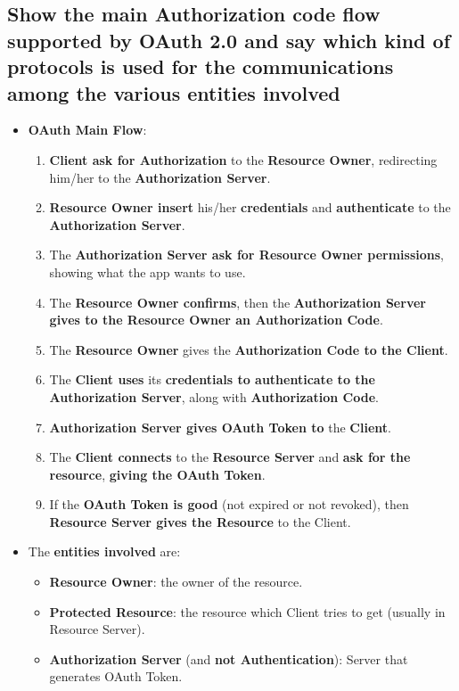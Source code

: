 \documentclass[9pt, letterpaper]{article}
\begin{document}
\subsection{Show the main Authorization code flow supported by OAuth 2.0 and say which kind of protocols is used for the communications among the various entities involved}
\begin{itemize}
	\item \textbf{OAuth Main Flow}:
	      \begin{enumerate}
		      \item \textbf{Client ask for Authorization} to the \textbf{Resource Owner}, redirecting him/her to the \textbf{Authorization Server}.
		      \item \textbf{Resource Owner insert} his/her \textbf{credentials} and \textbf{authenticate} to the \textbf{Authorization Server}.
		      \item The \textbf{Authorization Server ask for Resource Owner permissions}, showing what the app wants to use.
		      \item The \textbf{Resource Owner confirms}, then the \textbf{Authorization Server gives to the Resource Owner an Authorization Code}.
		      \item The \textbf{Resource Owner} gives the \textbf{Authorization Code to the Client}.
		      \item The \textbf{Client uses} its \textbf{credentials to authenticate to the Authorization Server}, along with \textbf{Authorization Code}.
		      \item \textbf{Authorization Server gives OAuth Token to} the \textbf{Client}.
		      \item The \textbf{Client connects} to the \textbf{Resource Server} and \textbf{ask for the resource}, \textbf{giving the OAuth Token}.
		      \item If the \textbf{OAuth Token is good} (not expired or not revoked), then \textbf{Resource Server gives the Resource} to the Client.
	      \end{enumerate}
	\item The \textbf{entities involved} are:
	      \begin{itemize}
		      \item \textbf{Resource Owner}: the owner of the resource.
		      \item \textbf{Protected Resource}: the resource which Client tries to get (usually in Resource Server).
		      \item \textbf{Authorization Server} (and \textbf{not Authentication}): Server that generates OAuth Token.

\end{itemize}
\end{itemize}
\end{document}
